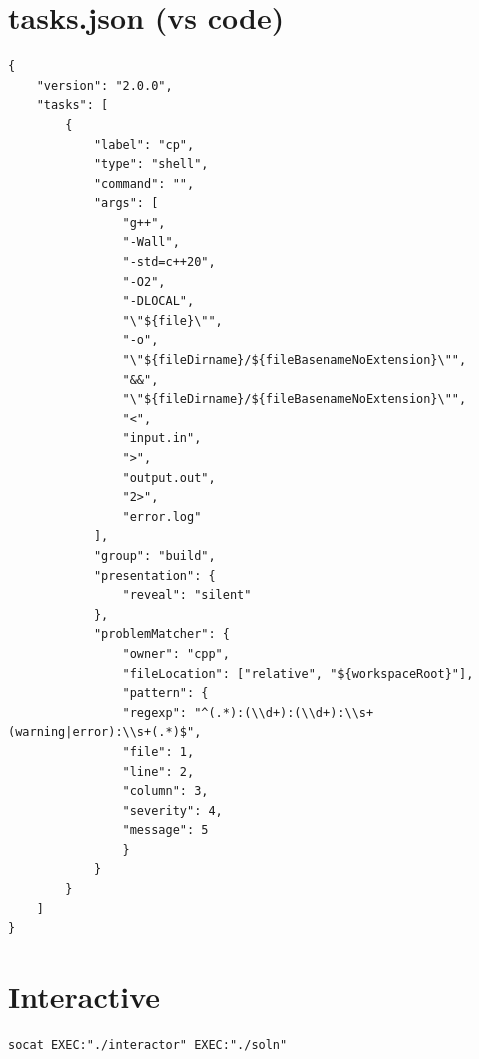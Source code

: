 \section{tasks.json (vs code)}
\begin{lstlisting}
{
    "version": "2.0.0",
    "tasks": [
        {
            "label": "cp",
            "type": "shell",
            "command": "",
            "args": [
                "g++",
                "-Wall",
                "-std=c++20",
                "-O2",
                "-DLOCAL",
                "\"${file}\"",
                "-o",
                "\"${fileDirname}/${fileBasenameNoExtension}\"",
                "&&",
                "\"${fileDirname}/${fileBasenameNoExtension}\"",
                "<",
                "input.in",
                ">",
                "output.out",
                "2>",
                "error.log"
            ],
            "group": "build",
            "presentation": {
                "reveal": "silent"
            },
            "problemMatcher": {
                "owner": "cpp",
                "fileLocation": ["relative", "${workspaceRoot}"],
                "pattern": {
                "regexp": "^(.*):(\\d+):(\\d+):\\s+(warning|error):\\s+(.*)$",
                "file": 1,
                "line": 2,
                "column": 3,
                "severity": 4,
                "message": 5
                }
            }
        }
    ]
}
\end{lstlisting}
\sectionend

\section{Interactive}
\begin{lstlisting}
socat EXEC:"./interactor" EXEC:"./soln" 
\end{lstlisting}
\sectionend
